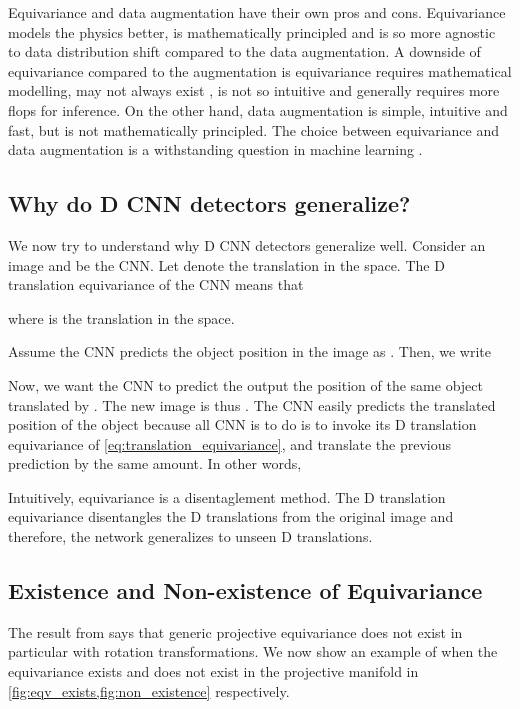 \documentclass[runningheads]{llncs}
\newcommand{\twoD}{D}
\newcommand{\equivariance}{equivariance}
\newcommand{\Equivariance}{Equivariance}
\begin{document}
        \Equivariance{} and data augmentation have their own pros and cons.
        \Equivariance{} models the physics better, is mathematically principled and is so more agnostic to data distribution shift compared to the data augmentation.
        A downside of \equivariance{} compared to the augmentation is \equivariance{} requires mathematical modelling, may not always exist \cite{burns1992non}, is not so intuitive and generally requires more flops for inference.
        On the other hand, data augmentation is simple, intuitive and fast, but is not mathematically principled. 
        The choice between \equivariance{} and data augmentation is a withstanding question in machine learning \cite{gandikota2021training}.
    
\subsection{Why do \twoD{} CNN detectors generalize?}
        We now try to understand why \twoD{} CNN detectors generalize well.
        Consider an image  and  be the CNN.
        Let  denote the translation in the  space.
        The \twoD{} translation \equivariance{} \cite{bronstein2021convolution, bronstein2021geometric, rath2020boosting} of the CNN means that 
        
        where  is the translation in the  space.
        
        Assume the CNN predicts the object position in the image as . 
        Then, we write
            
        
        Now, we want the CNN to predict the output the position of the same object translated by .
        The new image is thus .
        The CNN easily predicts the translated position of the object because all CNN is to do is to invoke its \twoD{} translation \equivariance{} of \cref{eq:translation_equivariance}, and translate the previous prediction by the same amount.
        In other words,
        
        Intuitively, \equivariance{} is a disentaglement method. 
        The \twoD{} translation \equivariance{} disentangles the \twoD{} translations  from the original image  and therefore, the network generalizes to unseen \twoD{} translations.
    
    
\subsection{Existence and Non-existence of \Equivariance{}}
        The result from \cite{burns1992non} says that generic projective \equivariance{} does not exist in particular with rotation transformations.
        We now show an example of when the \equivariance{} exists and does not exist in the projective manifold in \cref{fig:eqv_exists,fig:non_existence} respectively.
    
\end{document}
